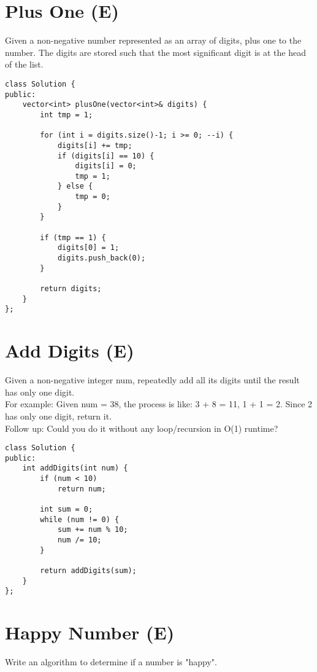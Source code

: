 \section{Plus One (E)}
Given a non-negative number represented as an array of digits, plus one to the number. The digits are stored such that the most significant digit is at the head of the list. \\

\begin{lstlisting}
class Solution {
public:
    vector<int> plusOne(vector<int>& digits) {
        int tmp = 1;
        
        for (int i = digits.size()-1; i >= 0; --i) {
            digits[i] += tmp;
            if (digits[i] == 10) {
                digits[i] = 0;
                tmp = 1;
            } else {
                tmp = 0;
            }
        }
        
        if (tmp == 1) {
            digits[0] = 1;
            digits.push_back(0);
        }
        
        return digits;
    }
};
\end{lstlisting}


\section{Add Digits (E)}
Given a non-negative integer num, repeatedly add all its digits until the result has only one digit.\\

For example:
Given num = 38, the process is like: 3 + 8 = 11, 1 + 1 = 2. Since 2 has only one digit, return it.\\

Follow up:
Could you do it without any loop/recursion in O(1) runtime? \\

\begin{lstlisting}
class Solution {
public:
    int addDigits(int num) {
        if (num < 10)
            return num;
        
        int sum = 0;
        while (num != 0) {
            sum += num % 10;
            num /= 10;
        }
        
        return addDigits(sum);
    }
};
\end{lstlisting}


\section{Happy Number (E)}
Write an algorithm to determine if a number is "happy".\\

